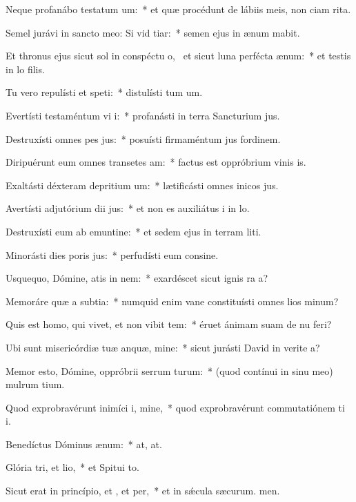 \item Neque profanábo testatum um:~* et quæ procédunt de lábiis meis, non ciam rita.
\item Semel jurávi in sancto meo: Si vid tiar:~* semen ejus in ænum mabit.
\item Et thronus ejus sicut sol in conspéctu o,~\pscross{} et sicut luna perfécta  ænum:~* et testis in lo filis.
\item Tu vero repulísti et speti:~* distulísti tum um.
\item Evertísti testaméntum vi i:~* profanásti in terra Sancturium jus.
\item Destruxísti omnes pes jus:~* posuísti firmaméntum jus fordinem.
\item Diripuérunt eum omnes transetes am:~* factus est oppróbrium vinis is.
\item Exaltásti déxteram depritium um:~* lætificásti omnes inicos jus.
\item Avertísti adjutórium dii jus:~* et non es auxiliátus i in lo.
\item Destruxísti eum ab emuntine:~* et sedem ejus in terram liti.
\item Minorásti dies poris jus:~* perfudísti eum consine.
\item Usquequo, Dómine, atis in nem:~* exardéscet sicut ignis ra a?
\item Memoráre quæ a subtia:~* numquid enim vane constituísti omnes lios minum?
\item Quis est homo, qui vivet, et non vibit tem:~* éruet ánimam suam de nu feri?
\item Ubi sunt misericórdiæ tuæ anquæ, mine:~* sicut jurásti David in verite a?
\item Memor esto, Dómine, oppróbrii serrum turum:~* (quod contínui in sinu meo) mulrum tium.
\item Quod exprobravérunt inimíci i, mine,~* quod exprobravérunt commutatiónem ti i.
\item Benedíctus Dóminus  ænum:~* at, at.
\item Glória tri, et lio,~* et Spitui to.
\item Sicut erat in princípio, et , et per,~* et in sǽcula sæcurum. men.
